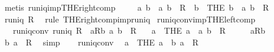 \begin{isabellebody}
\ {\isacharparenleft}metis\ runiq{\isacharunderscore}imp{\isacharunderscore}THE{\isacharunderscore}right{\isacharunderscore}comp{\isacharparenright}\isanewline
{}\isamarkupfalse%
\isanewline
\ \ \isamarkupfalse%
\ {\isachardoublequoteopen}{\isasymforall}\ a\ b\ {\isachardot}\ {\isacharparenleft}a{\isacharcomma}\ b{\isacharparenright}\ {\isasymin}\ R\ {\isasymlongrightarrow}\ b\ {\isacharequal}\ {\isacharparenleft}THE\ b\ {\isachardot}\ {\isacharparenleft}a{\isacharcomma}\ b{\isacharparenright}\ {\isasymin}\ R{\isacharparenright}{\isachardoublequoteclose}\isanewline
\ \ \isamarkupfalse%
\ \isamarkupfalse%
\ {\isachardoublequoteopen}runiq\ R{\isachardoublequoteclose}\ \isamarkupfalse%
\ {\isacharparenleft}rule\ THE{\isacharunderscore}right{\isacharunderscore}comp{\isacharunderscore}imp{\isacharunderscore}runiq{\isacharparenright}\isanewline
{}\isamarkupfalse%
%
\endisatagproof
{\isafoldproof}%
%
\isadelimproof
\isanewline
%
\endisadelimproof
\isanewline
{}\isamarkupfalse%
\ runiq{\isacharunderscore}conv{\isacharunderscore}imp{\isacharunderscore}THE{\isacharunderscore}left{\isacharunderscore}comp{\isacharcolon}\isanewline
\ \ \ runiq{\isacharunderscore}conv{\isacharcolon}\ {\isachardoublequoteopen}runiq\ {\isacharparenleft}R{\isasyminverse}{\isacharparenright}{\isachardoublequoteclose}\ \ aRb{\isacharcolon}\ {\isachardoublequoteopen}{\isacharparenleft}a{\isacharcomma}\ b{\isacharparenright}\ {\isasymin}\ R{\isachardoublequoteclose}\isanewline
\ \ \ {\isachardoublequoteopen}a\ {\isacharequal}\ {\isacharparenleft}THE\ a\ {\isachardot}\ {\isacharparenleft}a{\isacharcomma}\ b{\isacharparenright}\ {\isasymin}\ R{\isacharparenright}{\isachardoublequoteclose}\isanewline
%
\isadelimproof
%
\endisadelimproof
%
\isatagproof
{}\isamarkupfalse%
\ {\isacharminus}\isanewline
\ \ \isamarkupfalse%
\ aRb\ \isamarkupfalse%
\ {\isachardoublequoteopen}{\isacharparenleft}b{\isacharcomma}\ a{\isacharparenright}\ {\isasymin}\ R{\isasyminverse}{\isachardoublequoteclose}\ \isamarkupfalse%
\ simp\isanewline
\ \ \isamarkupfalse%
\ runiq{\isacharunderscore}conv\ \isamarkupfalse%
\ {\isachardoublequoteopen}a\ {\isacharequal}\ {\isacharparenleft}THE\ a\ {\isachardot}\ {\isacharparenleft}b{\isacharcomma}\ a{\isacharparenright}\ {\isasymin}\ R{\isasyminverse}{\isacharparenright}{\isachardoublequoteclose}\ \isamarkupfalse%

\end{isabellebody}
